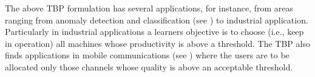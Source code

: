 The above TBP formulation has several applications, for instance, from areas ranging from anomaly detection and classification (see  \citet{locatelli2016optimal}) to industrial application. Particularly in industrial applications a learners objective is to choose (i.e., keep in  operation) all machines whose productivity is above a threshold. The TBP also finds applications in mobile communications (see \citet{audibert2010best})  where the users are to be allocated only those channels whose quality is above an acceptable threshold.

%
%
%
%
%